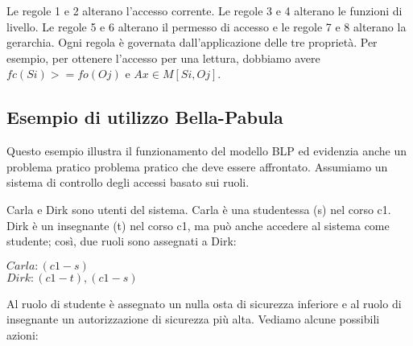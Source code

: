 Le regole 1 e 2 alterano l'accesso corrente. Le regole 3 e 4 alterano le funzioni di livello. Le regole 5 e 6 alterano il permesso di accesso e le regole 7 e 8 alterano la gerarchia. Ogni regola è governata dall'applicazione delle tre proprietà. Per esempio, per ottenere l'accesso per una lettura, dobbiamo avere $fc(Si) >= fo(Oj)$ e $Ax \in M[Si, Oj]$.

\subsection{Esempio di utilizzo Bella-Pabula}
Questo esempio illustra il funzionamento del modello BLP ed evidenzia anche un problema pratico problema pratico che deve essere affrontato. Assumiamo un sistema di controllo degli accessi basato sui ruoli. 

\singlespacing

Carla e Dirk sono utenti del sistema. Carla è una studentessa (s) nel corso c1. Dirk è un insegnante (t) nel corso c1, ma può anche accedere al sistema come studente; così, due ruoli sono assegnati a Dirk:

\begin{center}
    $Carla: (c1-s)$\\
    $Dirk: (c1-t), (c1-s)$
\end{center}

Al ruolo di studente è assegnato un nulla osta di sicurezza inferiore e al ruolo di insegnante un autorizzazione di sicurezza più alta. Vediamo alcune possibili azioni:

